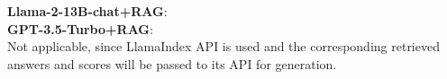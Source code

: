 \noindent \textbf{Llama-2-13B-chat+RAG}: \\
\noindent \textbf{GPT-3.5-Turbo+RAG}: \\
Not applicable, since LlamaIndex API is used and the corresponding retrieved answers and scores will be passed to its API for generation.


